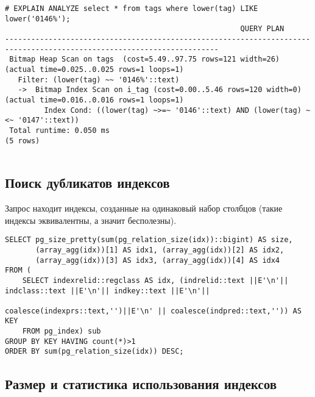 \begin{lstlisting}[label=lst:snippets14,title=snippets/speed\_like.sql]
# EXPLAIN ANALYZE select * from tags where lower(tag) LIKE lower('0146%');
                                                      QUERY PLAN                                                       
-----------------------------------------------------------------------------------------------------------------------
 Bitmap Heap Scan on tags  (cost=5.49..97.75 rows=121 width=26) (actual time=0.025..0.025 rows=1 loops=1)
   Filter: (lower(tag) ~~ '0146%'::text)
   ->  Bitmap Index Scan on i_tag (cost=0.00..5.46 rows=120 width=0) (actual time=0.016..0.016 rows=1 loops=1)
         Index Cond: ((lower(tag) ~>=~ '0146'::text) AND (lower(tag) ~<~ '0147'::text))
 Total runtime: 0.050 ms
(5 rows)


\end{lstlisting}

\subsection{Поиск дубликатов индексов}
Запрос находит индексы, созданные на одинаковый набор столбцов (такие индексы эквивалентны, а значит бесполезны).

\begin{lstlisting}[label=lst:snippets15,title=snippets/duplicate\_indexes.sql]
SELECT pg_size_pretty(sum(pg_relation_size(idx))::bigint) AS size,
       (array_agg(idx))[1] AS idx1, (array_agg(idx))[2] AS idx2,
       (array_agg(idx))[3] AS idx3, (array_agg(idx))[4] AS idx4
FROM (
    SELECT indexrelid::regclass AS idx, (indrelid::text ||E'\n'|| indclass::text ||E'\n'|| indkey::text ||E'\n'||
                                         coalesce(indexprs::text,'')||E'\n' || coalesce(indpred::text,'')) AS KEY
    FROM pg_index) sub
GROUP BY KEY HAVING count(*)>1
ORDER BY sum(pg_relation_size(idx)) DESC;
\end{lstlisting}

\subsection{Размер и статистика использования индексов}

